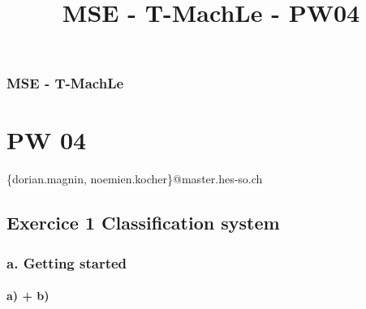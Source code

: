 \documentclass[11pt]{article}
\title{MSE - T-MachLe - PW04}
\begin{document}
    
    
    \maketitle
    
    

    
    \subsubsection{MSE - T-MachLe}\label{mse---t-machle}

\section{PW 04}\label{pw-04}

\{dorian.magnin, noemien.kocher\}@master.hes-so.ch

\subsection{Exercice 1 Classification
system}\label{exercice-1-classification-system}

\subsubsection{a. Getting started}\label{a.-getting-started}

\paragraph{a) + b)}\label{a-b}
\end{document}
